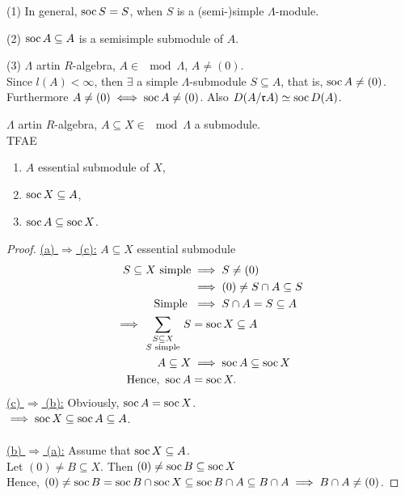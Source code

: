 \begin{note}
(1) In general, $\operatorname{soc} S = S$, when $S$ is a (semi-)simple $\Lambda$-module.

(2) $\operatorname{soc} A \subseteq A$ is a semisimple submodule of $A$.

(3) $\Lambda$ artin $R$-algebra, $A \in \mod\Lambda$, $A \neq (0)$.\\
Since $l(A) < \infty$, then $\exists$ a simple $\Lambda$-submodule $S
\subseteq A$, that is, $\operatorname{soc} A \neq (0)$. Furthermore $A \neq (0) \iff
\operatorname{soc} A \neq (0)$. Also $D(A / \mathfrak{r}A) \simeq \operatorname{soc} D(A)$.  
\end{note}


\begin{lem}
\label{lem:54}
$\Lambda$ artin $R$-algebra, $A \subseteq X \in \mod\Lambda$ a submodule.\\
TFAE
\begin{enumerate}[\rm(a)]
\item $A$ essential submodule of $X$, 
\item $\operatorname{soc} X \subseteq A$, 
\item $\operatorname{soc} A \subseteq \operatorname{soc} X$.
\end{enumerate} 
\end{lem}
\begin{proof}
\underline{(a) $\Rightarrow$ (c):} $A \subseteq X$ essential submodule\\
\begin{equation*}
\begin{split}
S \subseteq X \text{ simple} &\implies S \neq (0)\\
&\implies (0) \neq S\cap A \subseteq S\\
\text{Simple } &\implies S \cap A = S \subseteq A\\
\implies \sum_{\begin{smallmatrix} S \subseteq X\\ S \text{ simple} \end{smallmatrix}} S &= \operatorname{soc} X \subseteq A\\
A \subseteq X &\implies \operatorname{soc} A \subseteq \operatorname{soc} X\\
\text{Hence, } \operatorname{soc} A &= \operatorname{soc} X.
\end{split}
\end{equation*}
\underline{(c) $\Rightarrow$ (b):} Obviously, $\operatorname{soc} A = \operatorname{soc} X$.\\
$\implies \operatorname{soc} X \subseteq \operatorname{soc} A \subseteq A$.\\
\\
\underline{(b) $\Rightarrow$ (a):} Assume that $\operatorname{soc} X \subseteq A$.\\
Let $(0) \neq B \subseteq X$. Then $(0) \neq \operatorname{soc} B \subseteq \operatorname{soc} X$\\
Hence, $(0) \neq \operatorname{soc} B = \operatorname{soc} B \cap \operatorname{soc} X \subseteq \operatorname{soc} B \cap A \subseteq B \cap A \implies B \cap A \neq (0)$.
\end{proof}

